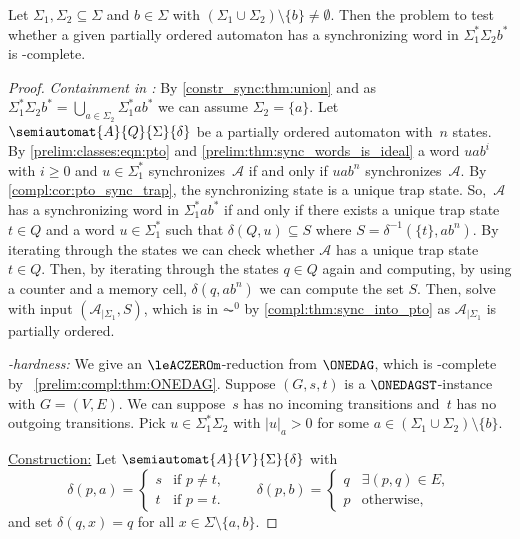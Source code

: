 \begin{lemma} \label{constrinput:pto:lem:Sigma1starSigma2bstar}
	Let $\Sigma_1, \Sigma_2 \subseteq \Sigma$ and $b \in \Sigma$ with $( \Sigma_1 \cup \Sigma_2 ) \setminus \{b\} \ne \emptyset$.
	Then the problem to test whether a given partially ordered
	automaton has a synchronizing word in $\Sigma_1^*\Sigma_2 b^*$
	is \LOGSPACE-complete.
\end{lemma} 
\begin{proof}
	\emph{Containment in \LOGSPACE:}
	By \cref{constr_sync:thm:union} and as $\Sigma_1^* \Sigma_2 b^* = \bigcup_{a \in \Sigma_2} \Sigma_1^*a b^*$
	we can assume $\Sigma_2 = \{a\}$.
	Let $\semiautomat{A}{Q}{\Sigma}{\delta}$ be a partially ordered automaton
	with~$n$ states. By \cref{prelim:classes:eqn:pto} and \cref{prelim:thm:sync_words_is_ideal} 
	a word $uab^i$ with $i \ge 0$ and $u \in \Sigma_1^*$ synchronizes~$\mathcal A$
	if and only if $uab^n$ synchronizes~$\mathcal A$.
	By \cref{compl:cor:pto_sync_trap}, the synchronizing state
	is a unique trap state. 
	So,~$\mathcal A$ has a synchronizing word in $\Sigma_1^* a b^*$
	if and only if there exists a unique trap state $t \in Q$ 
	and a word $u \in \Sigma_1^*$ such that $\delta(Q, u) \subseteq S$
	where $S = \delta^{-1}(\{t\}, ab^n)$.
	By iterating through the states
	we can check whether $\mathcal A$ has a unique trap state $t \in Q$.
	Then, by iterating through the states $q \in Q$ again
	and computing, by using a counter and a memory cell,
	$\delta(q, ab^n)$ 
	we can compute the set $S$.
	Then, solve \SIS with input $(\mathcal A_{|\Sigma_1}, S)$,
	which is in $\AC^0$ by \cref{compl:thm:sync_into_pto}
	as $\mathcal A_{|\Sigma_1}$ is partially ordered.
		
	\medskip 
	\noindent\emph{\LOGSPACE-hardness:} We give an $\leACZEROm$-reduction
	from $\ONEDAG$, which is \LOGSPACE-complete by \THM~\ref{prelim:compl:thm:ONEDAG}.
	Suppose $(G, s, t)$ is a $\ONEDAGST$-instance
	with $G = (V, E)$.
	We can suppose~$s$ has no incoming transitions and~$t$ has no outgoing transitions.
	Pick $u \in \Sigma_{1}^*\Sigma_{2}$ with $|u|_a > 0$ for some $a \in (\Sigma_1 \cup \Sigma_2) \setminus \{b\}$.
		
	\medskip
	\noindent\underline{Construction:}
	Let $\semiautomat{A}{V}{\Sigma}{\delta}$ with 
	\[
	\delta(p, a) = \begin{cases}
		s  & \text{if } p \ne t, \\
		t  & \text{if } p = t.
	\end{cases}
	\qquad 
	\delta(p, b) = \begin{cases} 
		q & \exists (p, q) \in E, \\
		p & \text{otherwise,}  
	\end{cases} 
	\]
	and set $\delta(q, x) = q$ for all $x \in \Sigma \setminus \{a,b\}$.	
	

\end{proof}
